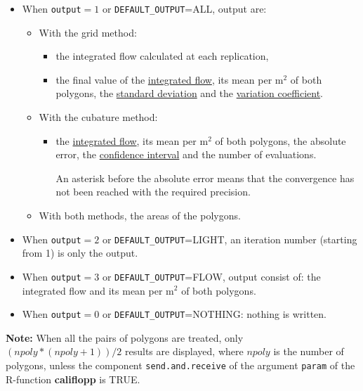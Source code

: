 \documentclass[a4paper,twoside,openright]{report}
\begin{document}
\begin{itemize}
\item
When \texttt{output}$=1$ or \texttt{DEFAULT\_OUTPUT}=ALL,
 output are:

\begin{itemize}
\item  
With the grid method:
\begin{itemize}
\item  
the  integrated flow calculated at each replication, 
\item
the  final value of the
\hyperlink{gridmean}{integrated flow}, its mean per m$^2$
of both polygons, the
 \hyperlink{gridet}{standard deviation}
and
the \hyperlink{gridcoefvar}{variation coefficient}.
\end{itemize}
\item
With the cubature method:
\begin{itemize}
\item  
the
\hyperlink{cubmean}{integrated flow}, its mean per m$^2$
of both polygons, the
 absolute error,  the
 \hyperlink{cubic}{confidence interval} and
the number of evaluations.

An asterisk before the absolute error
means that the convergence has not been reached
with the required precision.

\end{itemize}

\item
With both methods,  the areas of the  polygons.
\end{itemize}
\item
When \texttt{output}$=2$ 
or \texttt{DEFAULT\_OUTPUT}=LIGHT, an iteration number (starting from 1)
is only the output.
\item
When \texttt{output}$=3$ 
or  \texttt{DEFAULT\_OUTPUT}=FLOW, output consist of:
the integrated flow and  its mean per m$^2$
of both polygons.
\item
When \texttt{output}$=0$ 
or \texttt{DEFAULT\_OUTPUT}=NOTHING: nothing is written.
\end{itemize}
\textbf{Note:}
When  all the pairs of polygons are treated,
only $(npoly*(npoly+1))/2$ results are displayed,
where $npoly$ is the number of polygons,
unless the component \texttt{send.and.receive} of the argument \texttt{param}
of the R-function \textbf{califlopp} is TRUE.
\end{document}
